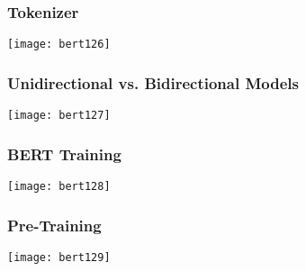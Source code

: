 \begin{frame}[fragile]\frametitle{Tokenizer}

			\begin{center}
			\texttt{[image: bert126]}
			\end{center}	

\end{frame}

\begin{frame}[fragile]\frametitle{ Unidirectional vs. Bidirectional Models}

			\begin{center}
			\texttt{[image: bert127]}
			\end{center}	

\end{frame}

\begin{frame}[fragile]\frametitle{ BERT Training}

			\begin{center}
			\texttt{[image: bert128]}
			\end{center}	


\end{frame}

\begin{frame}[fragile]\frametitle{Pre-Training}

			\begin{center}
			\texttt{[image: bert129]}
			\end{center}	


\end{frame}
